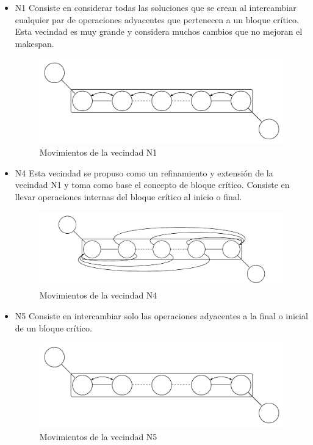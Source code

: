 \begin{itemize}
\item N1 \cite{blazewicz1996job} Consiste en considerar todas las soluciones que se crean al intercambiar cualquier par de operaciones adyacentes que pertenecen a un bloque crítico. Esta vecindad es muy grande y considera muchos cambios que no mejoran el makespan.
\begin{figure}[H]
\centering
\includegraphics[scale=.7]{Imagenes/N1.pdf}
\caption{Movimientos de la vecindad N1}
\end{figure}

\item N4 \cite{dell1993applying} Esta vecindad se propuso como un refinamiento y extensión de la vecindad N1 y toma como base el concepto de bloque crítico. Consiste en llevar operaciones internas del bloque crítico al inicio o final. 
\begin{figure}[H]
\centering
\includegraphics[scale=.7]{Imagenes/N4.pdf}
\caption{Movimientos de la vecindad N4}
\end{figure}


\item N5 \cite{EugeniuszNowicki2003} Consiste en intercambiar solo las operaciones adyacentes a la final o inicial de un bloque crítico.  
\begin{figure}[H]
\centering
\includegraphics[scale=.7]{Imagenes/N5.pdf}
\caption{Movimientos de la vecindad N5}
\end{figure}


\end{itemize}
